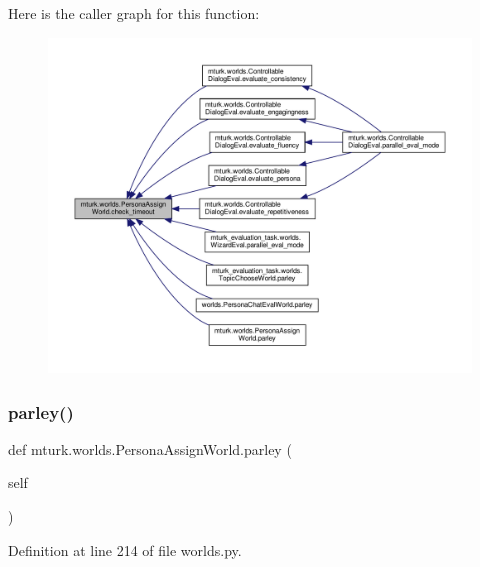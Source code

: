 Here is the caller graph for this function\+:
\nopagebreak
\begin{figure}[H]
\begin{center}
\leavevmode
\includegraphics[width=350pt]{classmturk_1_1worlds_1_1PersonaAssignWorld_a5039d4c0de8884794bee9b2683d43055_icgraph}
\end{center}
\end{figure}
\mbox{\label{classmturk_1_1worlds_1_1PersonaAssignWorld_a591fad7aeb3d2938543a669b0ac0dc15}} 
\subsubsection{\texorpdfstring{parley()}{parley()}}
{\footnotesize\ttfamily def mturk.\+worlds.\+Persona\+Assign\+World.\+parley (\begin{DoxyParamCaption}\item[{}]{self }\end{DoxyParamCaption})}



Definition at line 214 of file worlds.\+py.



